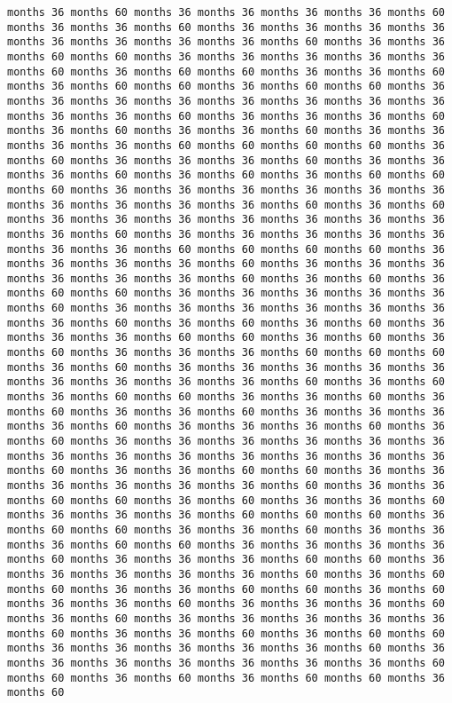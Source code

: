 \documentclass[11pt]{article}
\begin{document}
\begin{Verbatim}[commandchars=\\\{\}, frame=single, framerule=2mm, rulecolor=\color{outerrorbackground}]
months 36 months 60 months 36 months 36 months 36 months 36 months 60 months 36 months 36 months 60 months 36 months 36 months 36 months 36 months 36 months 36 months 36 months 36 months 60 months 36 months 36 months 60 months 60 months 36 months 36 months 36 months 36 months 36 months 60 months 36 months 60 months 60 months 36 months 36 months 60 months 36 months 60 months 60 months 36 months 60 months 60 months 36 months 36 months 36 months 36 months 36 months 36 months 36 months 36 months 36 months 36 months 60 months 36 months 36 months 36 months 60 months 36 months 60 months 36 months 36 months 60 months 36 months 36 months 36 months 36 months 60 months 60 months 60 months 60 months 36 months 60 months 36 months 36 months 36 months 60 months 36 months 36 months 36 months 60 months 36 months 60 months 36 months 60 months 60 months 60 months 36 months 36 months 36 months 36 months 36 months 36 months 36 months 36 months 36 months 36 months 60 months 36 months 60 months 36 months 36 months 36 months 36 months 36 months 36 months 36 months 36 months 60 months 36 months 36 months 36 months 36 months 36 months 36 months 36 months 60 months 60 months 60 months 60 months 36 months 36 months 36 months 36 months 60 months 36 months 36 months 36 months 36 months 36 months 36 months 60 months 36 months 60 months 36 months 60 months 60 months 36 months 36 months 36 months 36 months 36 months 60 months 36 months 36 months 36 months 36 months 36 months 36 months 36 months 60 months 36 months 60 months 36 months 60 months 36 months 36 months 36 months 60 months 60 months 36 months 60 months 36 months 60 months 36 months 36 months 36 months 60 months 60 months 60 months 36 months 60 months 36 months 36 months 36 months 36 months 36 months 36 months 36 months 36 months 36 months 60 months 36 months 60 months 36 months 60 months 60 months 36 months 36 months 60 months 36 months 60 months 36 months 36 months 60 months 36 months 36 months 36 months 36 months 60 months 36 months 36 months 36 months 60 months 36 months 60 months 36 months 36 months 36 months 36 months 36 months 36 months 36 months 36 months 36 months 36 months 36 months 36 months 36 months 60 months 36 months 36 months 60 months 60 months 36 months 36 months 36 months 36 months 36 months 36 months 60 months 36 months 36 months 60 months 60 months 36 months 60 months 36 months 36 months 60 months 36 months 36 months 36 months 60 months 60 months 60 months 36 months 60 months 60 months 36 months 36 months 60 months 36 months 36 months 36 months 60 months 60 months 36 months 36 months 36 months 36 months 60 months 36 months 36 months 36 months 60 months 60 months 36 months 36 months 36 months 36 months 36 months 60 months 36 months 60 months 60 months 36 months 36 months 60 months 60 months 36 months 60 months 36 months 36 months 60 months 36 months 36 months 36 months 60 months 36 months 60 months 36 months 36 months 36 months 36 months 36 months 60 months 36 months 36 months 60 months 36 months 60 months 60 months 36 months 36 months 36 months 36 months 36 months 60 months 36 months 36 months 36 months 36 months 36 months 36 months 36 months 60 months 60 months 36 months 60 months 36 months 60 months 60 months 36 months 60 
\end{Verbatim}
\end{document}
